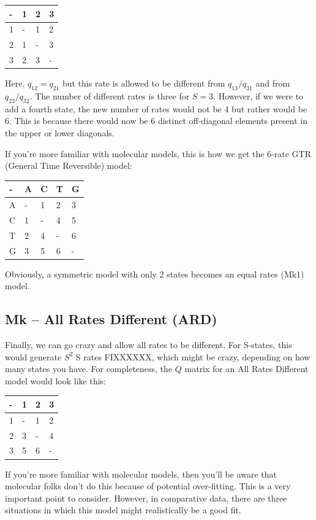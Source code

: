 \documentclass[]{book}
\begin{document}
\begin{longtable}[]{@{}llll@{}}
\toprule
- & 1 & 2 & 3\tabularnewline
\midrule
\endhead
1 & - & 1 & 2\tabularnewline
2 & 1 & - & 3\tabularnewline
3 & 2 & 3 & -\tabularnewline
\bottomrule
\end{longtable}

Here, \(q_{12} = q_{21}\) but this rate is allowed to be different from
\(q_{13}/q_{31}\) and from \(q_{23}/q_{32}\). The number of different
rates is three for \(S = 3\). However, if we were to add a fourth state,
the new number of rates would not be 4 but rather would be 6. This is
because there would now be 6 distinct off-diagonal elements present in
the upper or lower diagonals.

If you're more familiar with molecular models, this is how we get the
6-rate GTR (General Time Reversible) model:

\begin{longtable}[]{@{}lllll@{}}
\toprule
- & A & C & T & G\tabularnewline
\midrule
\endhead
A & - & 1 & 2 & 3\tabularnewline
C & 1 & - & 4 & 5\tabularnewline
T & 2 & 4 & - & 6\tabularnewline
G & 3 & 5 & 6 & -\tabularnewline
\bottomrule
\end{longtable}

Obviously, a symmetric model with only 2 states becomes an equal rates
(Mk1) model.

\subsection{Mk -- All Rates Different
(ARD)}\label{mk-all-rates-different-ard}

Finally, we can go crazy and allow all rates to be different. For
S-states, this would generate \(S^2\) S rates FIXXXXXX, which might be
crazy, depending on how many states you have. For completeness, the
\(Q\) matrix for an All Rates Different model would look like this:

\begin{longtable}[]{@{}llll@{}}
\toprule
- & 1 & 2 & 3\tabularnewline
\midrule
\endhead
1 & - & 1 & 2\tabularnewline
2 & 3 & - & 4\tabularnewline
3 & 5 & 6 & -\tabularnewline
\bottomrule
\end{longtable}

If you're more familiar with molecular models, then you'll be aware that
molecular folks don't do this because of potential over-fitting. This is
a very important point to consider. However, in comparative data, there
are three situations in which this model might realistically be a good
fit.
\end{document}
